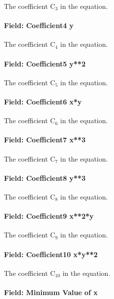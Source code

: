 The coefficient C\(_{3}\) in the equation.

\paragraph{Field: Coefficient4 y}\label{field-coefficient4-y-1}

The coefficient C\(_{4}\) in the equation.

\paragraph{Field: Coefficient5 y**2}\label{field-coefficient5-y2}

The coefficient C\(_{5}\) in the equation.

\paragraph{Field: Coefficient6 x*y}\label{field-coefficient6-xy}

The coefficient C\(_{6}\) in the equation.

\paragraph{Field: Coefficient7 x**3}\label{field-coefficient7-x3}

The coefficient C\(_{7}\) in the equation.

\paragraph{Field: Coefficient8 y**3}\label{field-coefficient8-y3}

The coefficient C\(_{8}\) in the equation.

\paragraph{Field: Coefficient9 x**2*y}\label{field-coefficient9-x2y}

The coefficient C\(_{9}\) in the equation.

\paragraph{Field: Coefficient10 x*y**2}\label{field-coefficient10-xy2}

The coefficient C\(_{10}\) in the equation.

\paragraph{Field: Minimum Value of x}\label{field-minimum-value-of-x-6}

